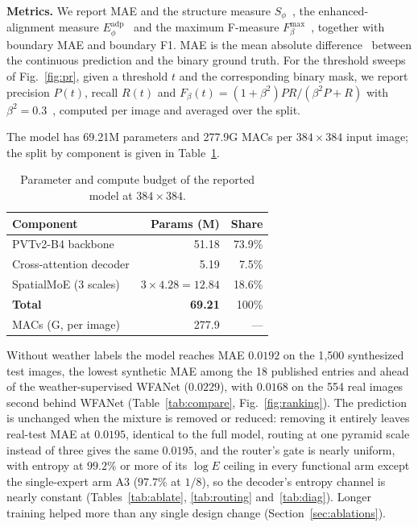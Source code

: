 \documentclass[10pt,a4paper,twocolumn,twoside]{article}
\begin{document}
\noindent\textbf{Metrics.} We report MAE and the structure measure $S_\phi$~\cite{struct-measure}, the enhanced-alignment measure $E_\phi^{\text{adp}}$~\cite{enhanced-measure} and the maximum F-measure $F_\beta^{\max}$~\cite{f-measure}, together with boundary MAE and boundary F1. MAE is the mean absolute difference~\cite{perazzi2012saliency} between the continuous prediction and the binary ground truth. For the threshold sweeps of Fig.~\ref{fig:pr}, given a threshold $t$ and the corresponding binary mask, we report precision $P(t)$, recall $R(t)$ and $F_\beta(t) = (1+\beta^2)PR/(\beta^2 P + R)$ with $\beta^2{=}0.3$~\cite{achanta2009frequency}, computed per image and averaged over the split.

The model has 69.21M parameters and 277.9G MACs per $384{\times}384$ input image; the split by component is given in Table~\ref{tab:cost}.

\begin{table}[tbp]
\centering
\caption{Parameter and compute budget of the reported model at $384{\times}384$.}
\label{tab:cost}
\small
\begin{tabular}{@{}lrr@{}}
\toprule
Component & Params (M) & Share \\
\midrule
PVTv2-B4 backbone & 51.18 & 73.9\% \\
Cross-attention decoder & 5.19 & 7.5\% \\
SpatialMoE (3 scales) & $3 \times 4.28 = 12.84$ & 18.6\% \\
\midrule
\textbf{Total} & \textbf{69.21} & 100\% \\
\quad MACs (G, per image) & 277.9 & --- \\
\bottomrule
\end{tabular}
\end{table}


\noindent Without weather labels the model reaches MAE $0.0192$ on the 1{,}500 synthesized
test images, the lowest synthetic MAE among the 18 published entries and ahead of the
weather-supervised WFANet ($0.0229$), with $0.0168$ on the 554 real images second behind
WFANet (Table~\ref{tab:compare}, Fig.~\ref{fig:ranking}). The prediction is unchanged when the
mixture is removed or reduced: removing it entirely leaves real-test MAE at $0.0195$,
identical to the full model, routing at one pyramid scale instead of three gives the same
$0.0195$, and the router's gate is nearly uniform, with entropy at $99.2\%$ or more of its
$\log E$ ceiling in every functional arm except the single-expert arm A3 ($97.7\%$ at $1/8$),
so the decoder's entropy channel is nearly constant (Tables~\ref{tab:ablate},
\ref{tab:routing} and~\ref{tab:diag}). Longer training helped more than any single design
change (Section~\ref{sec:ablations}).
\end{document}
